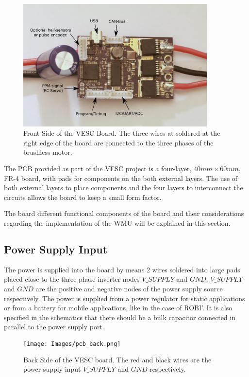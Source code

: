 \begin{figure}[htbp]
\centering
\includegraphics[width=10cm]{Images/pcb_front.png} 
\caption[VESC Front Side]{Front Side of the VESC Board. The three wires at soldered at the right edge of the board are connected to the three phases of the brushless motor.}
\label{fig:pcb_front}
\end{figure}

The \ac{PCB} provided as part of the VESC project is a four-layer, $40mm \times 60mm$, FR-4 board, with pads for components on the both external layers. The use of both external layers to place components and the four layers to interconnect the circuits allows the board to keep a small form factor.

The board different functional components of the board and their considerations regarding the implementation of the \ac{WMU} will be explained in this section.

\subsection{Power Supply Input}
The power is supplied into the board by means 2 wires soldered into large pads placed close to the three-phase inverter nodes $V\_SUPPLY$ and $GND$. $V\_SUPPLY$ and $GND$ are the positive and negative nodes of the power supply source respectively. The power is supplied from a power regulator for static applications or from a battery for mobile applications, like in the case of ROBI'. It is also specified in the schematics that there should be a bulk capacitor connected in parallel to the power supply port.

\begin{figure}[htbp]
\centering
\texttt{[image: Images/pcb\_back.png]} 
\caption[VESC Back Side]{Back Side of the VESC board. The red and black wires are the power supply input $V\_SUPPLY$ and $GND$ respectively.}
\label{fig:pcb_back}
\end{figure}

